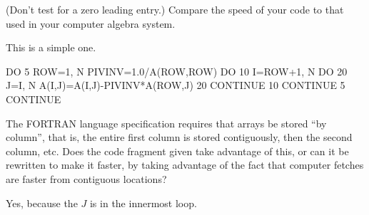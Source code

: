 \begin{exercises}
    (Don't test for a zero leading entry.)
    Compare the speed of your code to that used in your computer algebra
    system.
    \begin{answer}
      This is a simple one.
\begin{computercode}
DO 5 ROW=1, N
   PIVINV=1.0/A(ROW,ROW)
   DO 10 I=ROW+1, N
      DO 20 J=I, N
         A(I,J)=A(I,J)-PIVINV*A(ROW,J)
      20 CONTINUE
   10 CONTINUE
5 CONTINUE
\end{computercode}     
    \end{answer}
  \item The FORTRAN language specification requires that arrays be
    stored ``by column'', that is, the entire first column is stored
    contiguously, then the second column, etc.
    Does the code fragment given take advantage of this,
    or can it be rewritten to make it faster, by taking advantage of
    the fact that computer fetches are faster from contiguous locations?
    \begin{answer}
      Yes, because the $J$ is in the innermost loop.
    \end{answer}
\end{exercises}
\endinput
